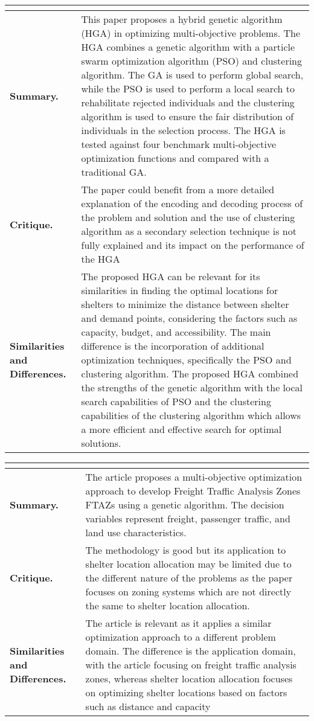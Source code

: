 \begin{longtable}{|L{.2\linewidth}|L{.74\linewidth}|}
	\hline
	\\ \hline
	\textbf{Summary.} & This paper proposes a hybrid genetic algorithm (HGA) in optimizing multi-objective problems. The HGA combines a genetic algorithm with a particle swarm optimization algorithm (PSO) and clustering algorithm. The GA is used to perform global search, while the PSO is used to perform a local search to rehabilitate rejected individuals and the clustering algorithm is used to ensure the fair distribution of individuals in the selection process. The HGA is tested against four benchmark multi-objective optimization functions and compared with a traditional GA.\\ \hline
	\textbf{Critique.} & The paper could benefit from a more detailed explanation of the encoding and decoding process of the problem and solution and the use of clustering algorithm as a secondary selection technique is not fully explained and its impact on the performance of the HGA\\ \hline
	\textbf{Similarities and Differences.} & The proposed HGA can be relevant for its similarities in finding the optimal locations for shelters to minimize the distance between shelter and demand points, considering the factors such as capacity, budget, and accessibility.	The main difference is the incorporation of additional optimization techniques, specifically the PSO and clustering algorithm. The proposed HGA combined the strengths of the genetic algorithm with the local search capabilities of PSO and the clustering capabilities of the clustering algorithm which allows a more efficient and effective search for optimal solutions.\\ \hline
\end{longtable}

\begin{longtable}{|L{.2\linewidth}|L{.74\linewidth}|}
	\hline
	\\ \hline
	\textbf{Summary.} & The article proposes a multi-objective optimization approach to develop Freight Traffic Analysis Zones FTAZs using a genetic algorithm. The decision variables represent freight, passenger traffic, and land use characteristics.\\ \hline
	\textbf{Critique.} & The methodology is good but its application to shelter location allocation may be limited due to the different nature of the problems as the paper focuses on zoning systems which are not directly the same to shelter location allocation.\\ \hline
	\textbf{Similarities and Differences.} & The article is relevant as it applies a similar optimization approach to a different problem domain. The difference is the application domain, with the article focusing on freight traffic analysis zones, whereas shelter location allocation focuses on optimizing shelter locations based on factors such as distance and capacity\\ \hline
\end{longtable}

